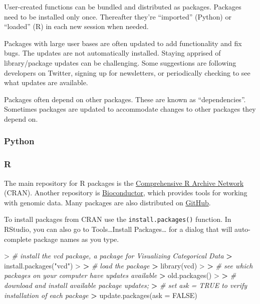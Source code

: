 \documentclass[
]{book}
\newenvironment{Shaded}{\begin{snugshade}}{\end{snugshade}}
\newcommand{\AttributeTok}[1]{\textcolor[rgb]{0.77,0.63,0.00}{#1}}
\newcommand{\CommentTok}[1]{\textcolor[rgb]{0.56,0.35,0.01}{\textit{#1}}}
\newcommand{\ConstantTok}[1]{\textcolor[rgb]{0.00,0.00,0.00}{#1}}
\newcommand{\ErrorTok}[1]{\textcolor[rgb]{0.64,0.00,0.00}{\textbf{#1}}}
\newcommand{\FunctionTok}[1]{\textcolor[rgb]{0.00,0.00,0.00}{#1}}
\newcommand{\NormalTok}[1]{#1}
\newcommand{\SpecialCharTok}[1]{\textcolor[rgb]{0.00,0.00,0.00}{#1}}
\newcommand{\StringTok}[1]{\textcolor[rgb]{0.31,0.60,0.02}{#1}}
\begin{document}
User-created functions can be bundled and distributed as packages. Packages need to be installed only once. Thereafter they're ``imported'' (Python) or ``loaded'' (R) in each new session when needed.

Packages with large user bases are often updated to add functionality and fix bugs. The updates are not automatically installed. Staying apprised of library/package updates can be challenging. Some suggestions are following developers on Twitter, signing up for newsletters, or periodically checking to see what updates are available.

Packages often depend on other packages. These are known as ``dependencies''. Sometimes packages are updated to accommodate changes to other packages they depend on.

\hypertarget{python-3}{%
\subsubsection*{Python}\label{python-3}}

\hypertarget{r-3}{%
\subsubsection*{R}\label{r-3}}

The main repository for R packages is the \href{https://cran.r-project.org/}{Comprehensive R Archive Network} (CRAN). Another repository is \href{https://www.bioconductor.org/}{Bioconductor}, which provides tools for working with genomic data. Many packages are also distributed on \href{https://github.com/}{GitHub}.

To install packages from CRAN use the \texttt{install.packages()} function. In RStudio, you can also go to Tools\ldots Install Packages\ldots{} for a dialog that will auto-complete package names as you type.

\begin{Shaded}
\begin{Highlighting}[]
\SpecialCharTok{\textgreater{}} \CommentTok{\# install the vcd package, a package for Visualizing Categorical Data}
\ErrorTok{\textgreater{}} \FunctionTok{install.packages}\NormalTok{(}\StringTok{"vcd"}\NormalTok{)}
\SpecialCharTok{\textgreater{}} 
\ErrorTok{\textgreater{}} \CommentTok{\# load the package}
\ErrorTok{\textgreater{}} \FunctionTok{library}\NormalTok{(vcd)}
\SpecialCharTok{\textgreater{}} 
\ErrorTok{\textgreater{}} \CommentTok{\# see which packages on your computer have updates available}
\ErrorTok{\textgreater{}} \FunctionTok{old.packages}\NormalTok{()}
\SpecialCharTok{\textgreater{}} 
\ErrorTok{\textgreater{}} \CommentTok{\# download and install available package updates;}
\ErrorTok{\textgreater{}} \CommentTok{\# set ask = TRUE to verify installation of each package}
\ErrorTok{\textgreater{}} \FunctionTok{update.packages}\NormalTok{(}\AttributeTok{ask =} \ConstantTok{FALSE}\NormalTok{)}
\end{Highlighting}
\end{Shaded}
\end{document}
